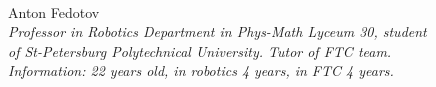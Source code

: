 \begin{figure}[H]
	\begin{minipage}[h]{0.47\linewidth}
		\\
	\end{minipage}
	\hfill
	\begin{minipage}{0.47\linewidth}
		Anton Fedotov \\ 
		\emph{Professor in Robotics Department in Phys-Math Lyceum 30, student of St-Petersburg Polytechnical University. Tutor of FTC team. \\}
		\emph{Information: 22 years old, in robotics 4 years, in FTC 4 years.}
	\end{minipage}	
	\vfill 
\end{figure}

